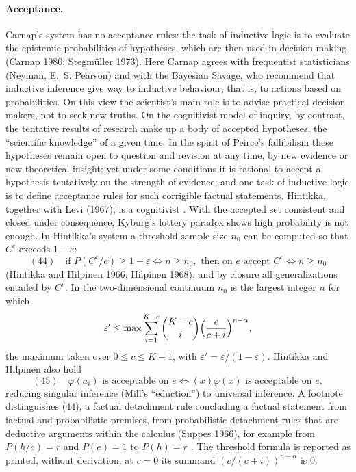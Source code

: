 \paragraph{Acceptance.} Carnap's system has no acceptance rules: the
task of inductive logic is to evaluate the epistemic probabilities of
hypotheses, which are then used in decision making (Carnap 1980;
Stegmüller 1973). Here Carnap agrees with frequentist statisticians
(Neyman, E.~S. Pearson) and with the Bayesian Savage, who recommend that
inductive inference give way to inductive behaviour, that is, to actions
based on probabilities. On this view the scientist's main role is to
advise practical decision makers, not to seek new truths. On the
cognitivist model of inquiry, by contrast, the tentative results of
research make up a body of accepted hypotheses, the ``scientific
knowledge'' of a given time. In the spirit of Peirce's fallibilism these
hypotheses remain open to question and revision at any time, by new
evidence or new theoretical insight; yet under some conditions it is
rational to accept a hypothesis tentatively on the strength of evidence,
and one task of inductive logic is to define acceptance rules for such
corrigible factual statements. Hintikka, together with Levi (1967), is a
cognitivist \cite[pp.~333--334]{Niiniluoto2011HintikkaProgramReading}. With the accepted set
consistent and closed under consequence, Kyburg's lottery paradox shows
high probability is not enough. In Hintikka's system a threshold sample
size \(n_0\) can be computed so that \(C^c\) exceeds \(1-\varepsilon\):
\[
 (44)\quad\text{if }P(C^c/e)\geq1-\varepsilon\iff n\geq n_0,\text{ then on }
 e\text{ accept }C^c\iff n\geq n_0
\]
(Hintikka and Hilpinen 1966; Hilpinen 1968), and by closure all
generalizations entailed by \(C^c\). In the two-dimensional continuum
\(n_0\) is the largest integer \(n\) for which
\[
 \varepsilon'\leq\max\sum_{i=1}^{K-c}\binom{K-c}{i}\Bigl(\frac c{c+i}\Bigr)^{n-\alpha},
\]
the maximum taken over \(0\leq c\leq K-1\), with
\(\varepsilon'=\varepsilon/(1-\varepsilon)\). Hintikka and Hilpinen also
hold
\[
 (45)\quad \varphi(a_i)\text{ is acceptable on }e\iff(x)\varphi(x)
 \text{ is acceptable on }e,
\]
reducing singular inference (Mill's ``eduction'') to universal inference.
A footnote distinguishes (44), a factual detachment rule concluding a
factual statement from factual and probabilistic premises, from
probabilistic detachment rules that are deductive arguments within the
calculus (Suppes 1966), for example from \(P(h/e)=r\) and \(P(e)=1\) to
\(P(h)=r\) \cite[pp.~333--334 and n.~8]{Niiniluoto2011HintikkaProgramReading}.
The threshold formula is reported as printed, without derivation; at
\(c=0\) its summand \((c/(c+i))^{n-\alpha}\) is \(0\).

